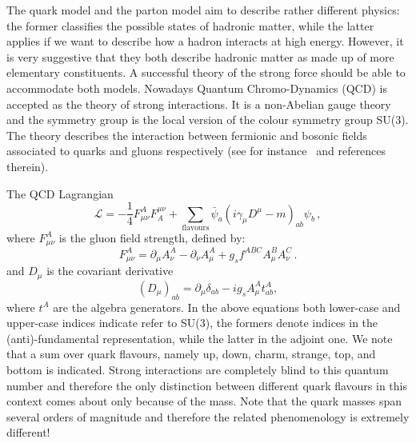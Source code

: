 The quark model and the parton model aim to describe rather different physics: the former classifies the possible states of hadronic matter, while the latter applies if we want to describe how a hadron interacts at high energy. However, it is very suggestive that they both describe hadronic matter as made up of more elementary constituents. 
%
A successful theory of the strong force should be able to accommodate both models. Nowadays Quantum Chromo-Dynamics (QCD) is accepted as the theory of strong interactions.
It is a non-Abelian gauge theory and the symmetry group is the local version of the colour symmetry group SU(3). The theory describes the interaction between fermionic and bosonic fields
associated to quarks and gluons respectively (see for instance~\cite{Peskin:257493,Schwartz:2013pla,Collins:1350496,Ellis:1991qj,Campbell:2286381} and references therein).

The QCD Lagrangian
\begin{equation}\label{eq:qcd-lagrangian}
\mathcal{L}= -\frac{1}{4}F^A_{\mu\nu}F_A^{\mu\nu}+
\sum_\text{flavours}\bar{\psi}_a (i \gamma_\mu D^\mu-m)_{ab}\psi_b \,,
\end{equation}
where  $F^A_{\mu \nu}$ is
the gluon field strength, defined by:
\begin{equation}\label{eq:qcd-fs}
F_{\mu\nu}^A= \partial_\mu A_\nu^A - \partial_\nu A_\mu^A +
g_sf^{ABC}A_\mu^BA_\nu^C \,.
\end{equation}
and $D_\mu$ is the covariant derivative
\begin{equation}
\left( D_\mu\right)_{ab}=\partial_\mu \delta_{ab}- i g_s A_\mu^A t^A_{ab},
\end{equation}
where $t^A$ are the algebra generators.
In the above equations both lower-case and upper-case indices indicate refer to SU(3), the formers denote indices in the (anti)-fundamental representation, while the latter in the adjoint one. We note that a sum over quark flavours, namely up, down, charm, strange, top, and bottom is indicated. Strong interactions are completely blind to this quantum number and therefore the only distinction between different quark flavours in this context comes about only because of the mass. Note that the quark masses span several orders of magnitude and therefore the related phenomenology is extremely different!



